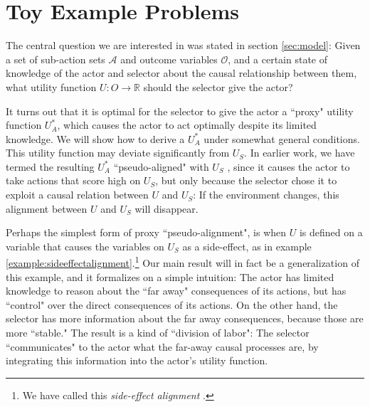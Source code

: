  
 
\section{Toy Example Problems}\label{sec:causal:examples}
 
The central question we are interested in was stated in section \ref{sec:model}: Given a set of sub-action sets $\mathcal A$ and outcome variables $\mathcal O$, and a certain state of knowledge of the actor and selector about the causal relationship between them, what utility function $U\colon O\to \mathbb R$ should the selector give the actor? 
 
It turns out that it is optimal for the selector to give the actor a ``proxy" utility function $U_A^*$, which causes the actor to act optimally despite its limited knowledge. We will show how to derive a $U_A^*$ under somewhat general conditions. This utility function may deviate significantly from $U_S$. In earlier work, we have termed the resulting $U_A^*$ ``pseudo-aligned" with $U_S$ \citep{Hubinger2019}, since it causes the actor to take actions that score high on $U_S$, but only because the selector chose it to exploit a causal relation between $U$ and $U_S$: If the environment changes, this alignment between $U$ and $U_S$ will disappear.
 
Perhaps the simplest form of proxy ``pseudo-alignment", is when $U$ is defined on a variable that causes the variables on $U_S$ as a side-effect, as in example \ref{example:sideeffectalignment}.\footnote{We have called this \textit{side-effect alignment} \citep{Hubinger2019}. } Our main result will in fact be a generalization of this example, and it formalizes on a simple intuition: The actor has limited knowledge to reason about the ``far away" consequences of its actions, but has ``control" over the direct consequences of its actions. On the other hand, the selector has more information about the far away consequences, because those are more ``stable." The result is a kind of ``division of labor": The selector ``communicates" to the actor what the far-away causal processes are, by integrating this information into the actor's utility function.
 
